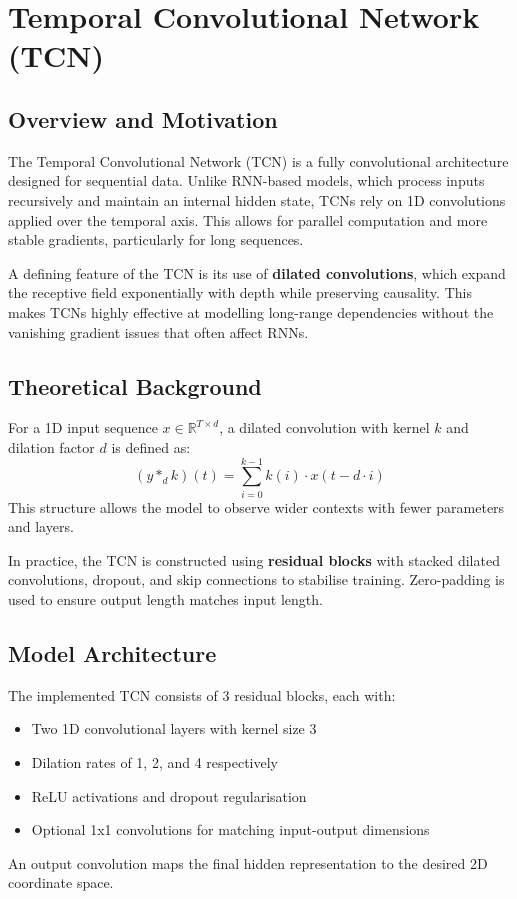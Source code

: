 \section{Temporal Convolutional Network (TCN)}

\subsection{Overview and Motivation}
The Temporal Convolutional Network (TCN) is a fully convolutional architecture designed for sequential data. Unlike RNN-based models, which process inputs recursively and maintain an internal hidden state, TCNs rely on 1D convolutions applied over the temporal axis. This allows for parallel computation and more stable gradients, particularly for long sequences.

A defining feature of the TCN is its use of \textbf{dilated convolutions}, which expand the receptive field exponentially with depth while preserving causality. This makes TCNs highly effective at modelling long-range dependencies without the vanishing gradient issues that often affect RNNs.

\subsection{Theoretical Background}
For a 1D input sequence $x \in \mathbb{R}^{T \times d}$, a dilated convolution with kernel $k$ and dilation factor $d$ is defined as:
\[
(y *_{d} k)(t) = \sum_{i=0}^{k-1} k(i) \cdot x(t - d \cdot i)
\]
This structure allows the model to observe wider contexts with fewer parameters and layers.

In practice, the TCN is constructed using \textbf{residual blocks} with stacked dilated convolutions, dropout, and skip connections to stabilise training. Zero-padding is used to ensure output length matches input length.

\subsection{Model Architecture}
The implemented TCN consists of 3 residual blocks, each with:
\begin{itemize}
    \item Two 1D convolutional layers with kernel size 3
    \item Dilation rates of 1, 2, and 4 respectively
    \item ReLU activations and dropout regularisation
    \item Optional 1x1 convolutions for matching input-output dimensions
\end{itemize}
An output convolution maps the final hidden representation to the desired 2D coordinate space.

